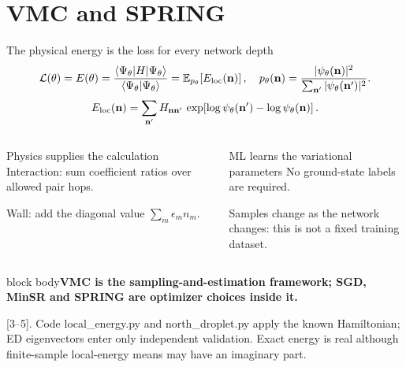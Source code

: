\documentclass[aspectratio=169,10pt]{beamer}
\newcommand{\src}[1]{\vfill{\fontsize{6.3}{7.5}\selectfont\color{muted}#1\par}}
\newcommand{\take}[1]{\vspace{1mm}\begin{beamercolorbox}[sep=1.6mm,wd=\textwidth]{block body}\small\color{teal}\textbf{#1}\end{beamercolorbox}}
\newcommand{\E}{\mathbb E}
\newcommand{\ket}[1]{\lvert #1\rangle}
\newcommand{\bra}[1]{\langle #1\rvert}
\newcommand{\nn}{\mathbf n}
\begin{document}
\section{VMC and SPRING}
\begin{frame}{The physical energy is the loss for every network depth}
\[
\mathcal L(\theta)=E(\theta)=
\frac{\bra{\Psi_\theta}H\ket{\Psi_\theta}}{\langle\Psi_\theta|\Psi_\theta\rangle}
=\E_{p_\theta}\!\left[E_{\rm loc}(\nn)\right],\quad
p_\theta(\nn)=\frac{|\psi_\theta(\nn)|^2}{\sum_{\nn'}|\psi_\theta(\nn')|^2}.
\]
\[
E_{\rm loc}(\nn)=\sum_{\nn'}H_{\nn\nn'}\,
\exp\!\left[\log\psi_\theta(\nn')-\log\psi_\theta(\nn)\right].
\]
\begin{columns}[T,onlytextwidth]
\begin{block}{Physics supplies the calculation}
Interaction: sum coefficient ratios over allowed pair hops.\par\smallskip
Wall: add the diagonal value $\sum_m\epsilon_m n_m$.
\end{block}
\begin{block}{ML learns the variational parameters}
No ground-state labels are required.\par\smallskip
Samples change as the network changes: this is not a fixed training dataset.
\end{block}
\end{columns}
\take{VMC is the sampling-and-estimation framework; SGD, MinSR and SPRING are optimizer choices inside it.}
\src{[3--5]. Code local\_energy.py and north\_droplet.py apply the known Hamiltonian; ED eigenvectors enter only independent validation. Exact energy is real although finite-sample local-energy means may have an imaginary part.}
\end{frame}
\end{document}
